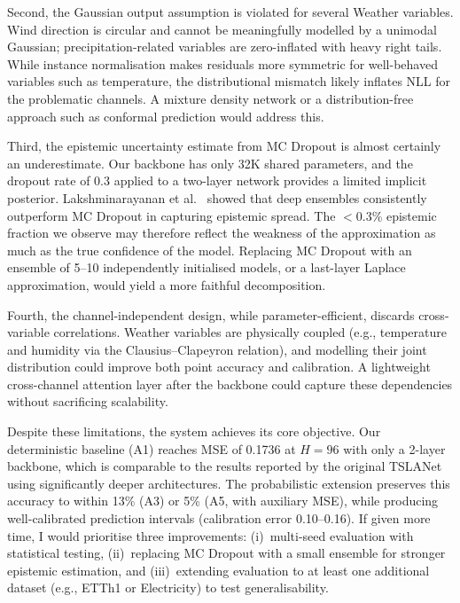 \documentclass{llncs}
\begin{document}
Second, the Gaussian output assumption is violated for several Weather variables. Wind direction is circular and cannot be meaningfully modelled by a unimodal Gaussian; precipitation-related variables are zero-inflated with heavy right tails. While instance normalisation makes residuals more symmetric for well-behaved variables such as temperature, the distributional mismatch likely inflates NLL for the problematic channels. A mixture density network or a distribution-free approach such as conformal prediction would address this.

Third, the epistemic uncertainty estimate from MC Dropout is almost certainly an underestimate. Our backbone has only 32K shared parameters, and the dropout rate of 0.3 applied to a two-layer network provides a limited implicit posterior. Lakshminarayanan et al.~\cite{lakshminarayanan2017simple} showed that deep ensembles consistently outperform MC Dropout in capturing epistemic spread. The $<$0.3\% epistemic fraction we observe may therefore reflect the weakness of the approximation as much as the true confidence of the model. Replacing MC Dropout with an ensemble of 5--10 independently initialised models, or a last-layer Laplace approximation, would yield a more faithful decomposition.

Fourth, the channel-independent design, while parameter-efficient, discards cross-variable correlations. Weather variables are physically coupled (e.g., temperature and humidity via the Clausius--Clapeyron relation), and modelling their joint distribution could improve both point accuracy and calibration. A lightweight cross-channel attention layer after the backbone could capture these dependencies without sacrificing scalability.

Despite these limitations, the system achieves its core objective. Our deterministic baseline (A1) reaches MSE of 0.1736 at $H{=}96$ with only a 2-layer backbone, which is comparable to the results reported by the original TSLANet~\cite{eldele2024tslanet} using significantly deeper architectures. The probabilistic extension preserves this accuracy to within 13\% (A3) or 5\% (A5, with auxiliary MSE), while producing well-calibrated prediction intervals (calibration error 0.10--0.16). If given more time, I would prioritise three improvements: (i)~multi-seed evaluation with statistical testing, (ii)~replacing MC Dropout with a small ensemble for stronger epistemic estimation, and (iii)~extending evaluation to at least one additional dataset (e.g., ETTh1 or Electricity) to test generalisability.
\end{document}
